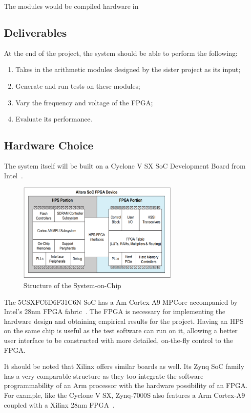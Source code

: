 \documentclass[journal]{IEEEtran}
\begin{document}
The modules would be compiled hardware in 

\subsection{Deliverables}
At the end of the project, the system should be able to perform the following:
\begin{enumerate}
  \item Takes in the arithmetic modules designed by the sister project as its
        input;
  \item Generate and run tests on these modules;
  \item Vary the frequency and voltage of the FPGA;
  \item Evaluate its performance.
\end{enumerate}

\subsection{Hardware Choice}
The system itself will be built on a Cyclone V SX SoC Development Board from
Intel~\cite{Intel1}.

\begin{figure}[H]
  \centering
  \includegraphics[width=8cm]{img/SoCStructure}
  \caption{Structure of the System-on-Chip}
  \label{SoCStructure}
\end{figure}

The 5CSXFC6D6F31C6N SoC has a Am Cortex-A9 MPCore accompanied by Intel's 28nm
FPGA fabric~\cite{Altera1}.
The FPGA is necessary for implementing the hardware design and obtaining
empirical results for the project.
Having an HPS on the same chip is useful as the test software can run on it,
allowing a better user interface to be constructed with more detailed,
on-the-fly control to the FPGA.

It should be noted that Xilinx offers similar boards as well. Its Zynq SoC
family has a very comparable structure as they too integrate the software
programmability of an Arm processor with the hardware possibility of an FPGA.
For example, like the Cyclone V SX, Zynq-7000S also features a Arm Cortex-A9
coupled with a Xilinx 28nm FPGA~\cite{Xilinx1}.
\end{document}
